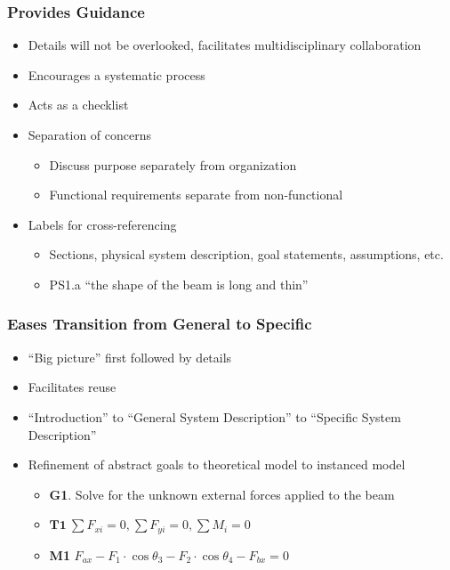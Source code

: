 \documentclass[t,12pt,numbers,fleqn]{beamer}
\begin{document}
\begin{frame}
\frametitle{Provides Guidance}
\begin{itemize}
\item Details will not be overlooked, facilitates multidisciplinary collaboration
\item Encourages a systematic process
\item Acts as a checklist
\item Separation of concerns
\begin{itemize}
\item Discuss purpose separately from organization
\item Functional requirements separate from non-functional
\end{itemize}
\item Labels for cross-referencing
\begin{itemize}
\item Sections, physical system description, goal statements, assumptions, etc.
\item PS1.a ``the shape of the beam is long and thin''
\end{itemize}
\end{itemize}
\end{frame}


\begin{frame}
\frametitle{Eases Transition from General to Specific}
\begin{itemize}
\item ``Big picture'' first followed by details
\item Facilitates reuse
\item ``Introduction'' to ``General System Description'' to ``Specific System Description''
\item Refinement of abstract goals to theoretical model to instanced model
\begin{itemize}
\item \textbf{G1}. Solve for the unknown external forces applied to the beam
\item $ \textbf{T1}~ 
\textrm{$\sum{F_{xi}} = 0$,}~  
\textrm{$\sum{F_{yi}} = 0$,}~
\textrm{$\sum{M_i} = 0$}$
\item \textbf{M1} \textrm{$F_{ax} - F_1\cdot \cos\theta_3 - F_2\cdot \cos\theta_4 - F_{bx} = 0$}
\end{itemize}
\end{itemize}
\end{frame}
\end{document}
